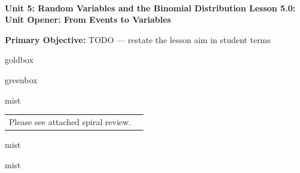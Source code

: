 \documentclass[10pt]{article}
\newcommand{\UnitNumberName}{Unit 5: Random Variables and the Binomial Distribution \quad}
\newcommand{\LessonNumberName}{Lesson 5.0: Unit Opener: From Events to Variables}
\begin{document}
\begin{center}
    {\Large\bfseries \CourseName \\
    {\small\bfseries \UnitNumberName \LessonNumberName}}
\end{center}

\begin{tcolorbox}[colback=mist, colframe=royal, boxrule=0.9pt, arc=2mm,
    left=2mm, right=2mm, top=1.5mm, bottom=1.5mm]
    \textbf{Primary Objective:} TODO --- restate the lesson aim in student terms
\end{tcolorbox}

\renewcommand{\arraystretch}{1.6}
\begin{skillbox}{goldbox}
\end{skillbox}

\begin{skillbox}{greenbox}
\end{skillbox}

\begin{fixedskillbox}{mist}
    \begin{tabularx}{\linewidth}{@{}X c@{}}
        \begin{minipage}[t]{0.55\linewidth}\vspace{0pt}
            Please see attached spiral review.  %
        \end{minipage}
        &
        \begin{minipage}[t]{0.38\linewidth}\vspace{0pt}\centering
        \end{minipage}
    \end{tabularx}
\end{fixedskillbox}

\begin{skillbox}[Hook]{mist}
\end{skillbox}

\begin{skillbox}[Lesson]{mist}
\end{skillbox}
\end{document}

